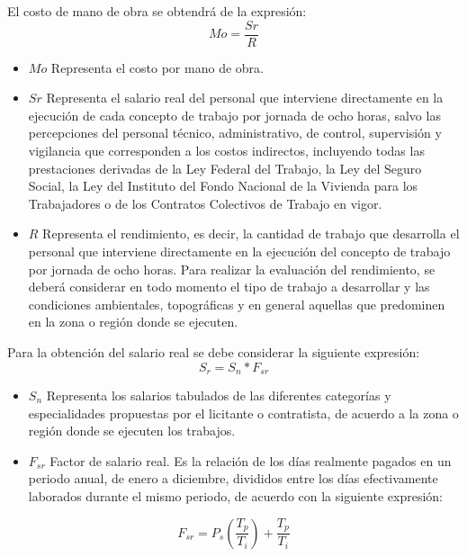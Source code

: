El costo de mano de obra se obtendrá de la expresión:
\begin{equation}
    Mo =\frac{Sr}{R}
\end{equation}
\begin{notation}
    \begin{itemize}
        \item $Mo$ Representa el costo por mano de obra.
        \item $Sr$ Representa el salario real del personal que interviene directamente en la ejecución de cada concepto de trabajo por jornada de ocho horas, salvo las percepciones del personal técnico, administrativo, de control, supervisión y vigilancia que corresponden a los costos indirectos, incluyendo todas las prestaciones derivadas de la Ley Federal del Trabajo, la Ley del Seguro Social, la Ley del Instituto del Fondo Nacional de la Vivienda para los Trabajadores o de los Contratos Colectivos de Trabajo en vigor.
        \item $R$ Representa el rendimiento, es decir, la cantidad de trabajo que desarrolla el personal que interviene directamente en la ejecución del concepto de trabajo por jornada de ocho horas. Para realizar la evaluación del rendimiento, se deberá considerar en todo momento el tipo de trabajo a desarrollar y las condiciones  ambientales, topográficas y en general aquellas que predominen en la zona o región donde se ejecuten.
    \end{itemize}
\end{notation}
Para la obtención del salario real se debe considerar la siguiente expresión:
\begin{equation}
    S_r = S_n*F_{sr}
\end{equation}
\begin{notation}
    \begin{itemize}
        \item $S_n$ Representa los salarios tabulados de las diferentes categorías y especialidades propuestas por el licitante o contratista, de acuerdo a la zona o región donde se ejecuten los trabajos.
        \item $F_{sr}$ Factor de salario real. Es la relación de los días realmente pagados en un periodo anual, de enero a diciembre, divididos entre los días efectivamente laborados durante el mismo periodo, de acuerdo con la siguiente expresión:
    \end{itemize}
\end{notation}
\begin{equation}
    F_{sr} = P_s\left(\frac{T_p}{T_i}\right) + \frac{T_p}{T_i}
\end{equation}
